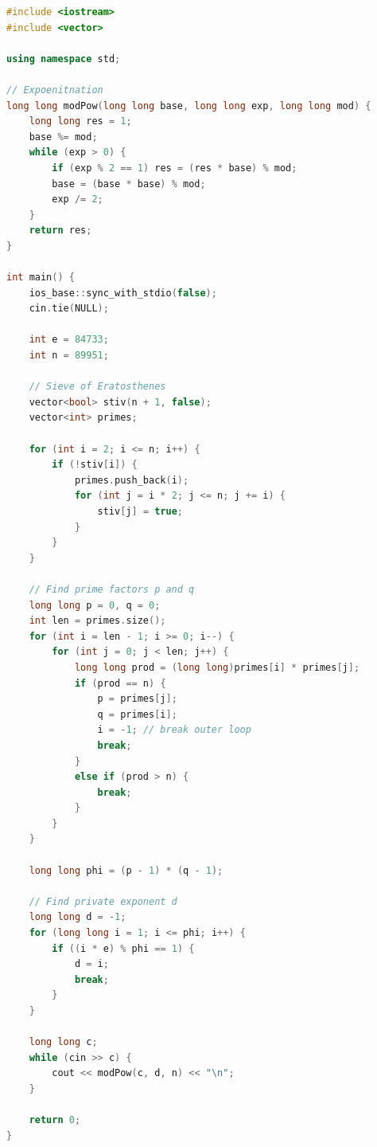 \documentclass[12pt]{article}
\begin{document}
\begin{lstlisting}[language=C++]
#include <iostream>
#include <vector>

using namespace std;

// Expoenitnation
long long modPow(long long base, long long exp, long long mod) {
    long long res = 1;
    base %= mod;
    while (exp > 0) {
        if (exp % 2 == 1) res = (res * base) % mod;
        base = (base * base) % mod;
        exp /= 2;
    }
    return res;
}

int main() {
    ios_base::sync_with_stdio(false);
    cin.tie(NULL);

    int e = 84733;
    int n = 89951;

    // Sieve of Eratosthenes
    vector<bool> stiv(n + 1, false);
    vector<int> primes;

    for (int i = 2; i <= n; i++) {
        if (!stiv[i]) {
            primes.push_back(i);
            for (int j = i * 2; j <= n; j += i) {
                stiv[j] = true;
            }
        }
    }

    // Find prime factors p and q
    long long p = 0, q = 0;
    int len = primes.size();
    for (int i = len - 1; i >= 0; i--) {
        for (int j = 0; j < len; j++) {
            long long prod = (long long)primes[i] * primes[j];
            if (prod == n) {
                p = primes[j];
                q = primes[i];
                i = -1; // break outer loop
                break;
            }
            else if (prod > n) {
                break;
            }
        }
    }

    long long phi = (p - 1) * (q - 1);

    // Find private exponent d
    long long d = -1;
    for (long long i = 1; i <= phi; i++) {
        if ((i * e) % phi == 1) {
            d = i;
            break;
        }
    }

    long long c;
    while (cin >> c) {
        cout << modPow(c, d, n) << "\n";
    }

    return 0;
}\end{lstlisting}


\newpage
\end{document}

